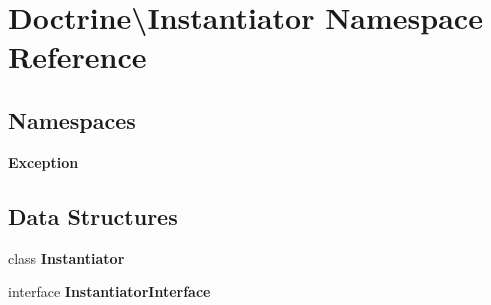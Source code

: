 \section{Doctrine\textbackslash{}Instantiator Namespace Reference}
\label{namespace_doctrine_1_1_instantiator}
\subsection*{Namespaces}
\begin{DoxyCompactItemize}
\item 
 {\bf Exception}
\end{DoxyCompactItemize}
\subsection*{Data Structures}
\begin{DoxyCompactItemize}
\item 
class {\bf Instantiator}
\item 
interface {\bf Instantiator\+Interface}
\end{DoxyCompactItemize}
